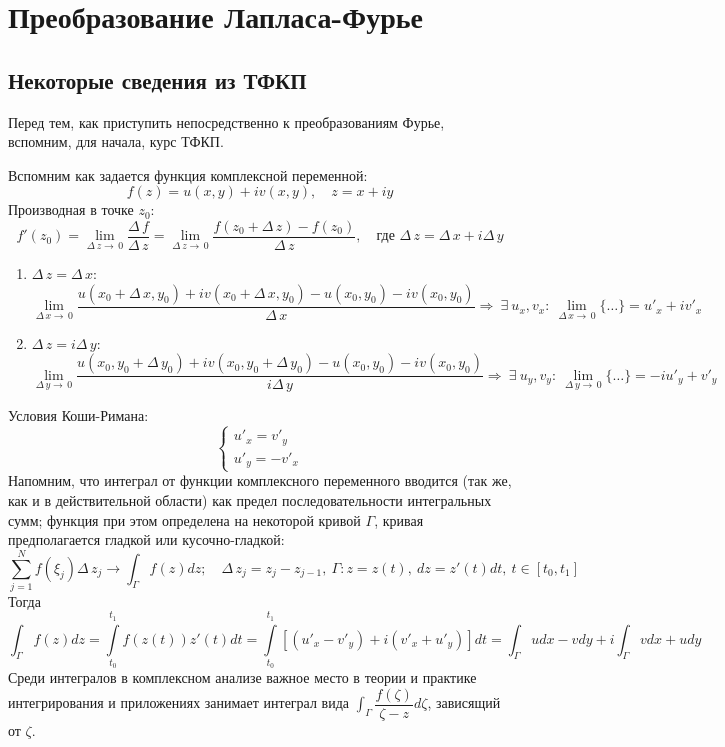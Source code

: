 \section{Преобразование Лапласа-Фурье}
\subsection{Некоторые сведения из ТФКП}
Перед тем, как приступить непосредственно к преобразованиям Фурье, вспомним, для начала, курс ТФКП. 

Вспомним как задается функция комплексной переменной:
$$
f(z)=u(x,y)+iv(x,y),\quad z=x+iy
$$
Производная в точке $z_0$:
$$
f'(z_0)=\lim_{\Delta\,z\to\,0}\dfrac{\Delta\,f}{\Delta\,z}=\lim_{\Delta\,z\to\,0}\dfrac{f(z_0+\Delta\,z)-f(z_0)}{\Delta\,z},\quad\text{где } \Delta\,z=\Delta\,x+i\Delta\,y
$$
\begin{enumerate}
\item $\Delta\,z = \Delta\,x$: 
$$
\lim_{\Delta\,x\to\,0}\dfrac{u(x_0+\Delta\,x,y_0)+iv(x_0+\Delta\,x,y_0)-u(x_0,y_0)-iv(x_0,y_0)}{\Delta\,x}\Rightarrow\:\exists\:u_x,v_x:\:\lim_{\Delta\,x\to\,0}\{\ldots\}=u'_x+iv'_x
$$
\item $\Delta\,z = i\Delta\,y$: 
$$
\lim_{\Delta\,y\to\,0}\dfrac{u(x_0,y_0+\Delta\,y_0)+iv(x_0,y_0+\Delta\,y_0)-u(x_0,y_0)-iv(x_0,y_0)}{i\Delta\,y}\Rightarrow\:\exists\:u_y,v_y:\:\lim_{\Delta\,y\to\,0}\{\ldots\}=-iu'_y+v'_y
$$
\end{enumerate}
Условия Коши-Римана:
$$
\begin{cases}
u'_x=v'_y\\
u'_y=-v'_x
\end{cases}
$$
Напомним, что интеграл от функции комплексного переменного вводится (так же, как и в действительной области) как предел последовательности интегральных сумм; функция при этом определена на некоторой кривой $\Gamma$, кривая предполагается гладкой или кусочно-гладкой:
$$
\sum\limits_{j=1}^{N}f(\xi_j)\Delta\,z_j\longrightarrow
\int_{\Gamma}f(z)dz;\quad \Delta\,z_j=z_j-z_{j-1},\: \Gamma: z=z(t),\: dz=z'(t)dt,\: t\in[t_0,t_1]
$$
Тогда 
$$
\int_{\Gamma}f(z)dz=\int\limits_{t_0}^{t_1}f(z(t))z'(t)dt=\int\limits_{t_0}^{t_1}\left[(u'_x-v'_y)+i(v'_x+u'_y)\right]dt=\int_{\Gamma}udx-vdy + i\int_{\Gamma}vdx+udy 
$$
Среди интегралов в комплексном анализе важное место в теории и практике  интегрирования и приложениях занимает интеграл вида $\int_{\Gamma}\dfrac{f(\zeta)}{\zeta-z}d\zeta$, зависящий от $\zeta$. 

